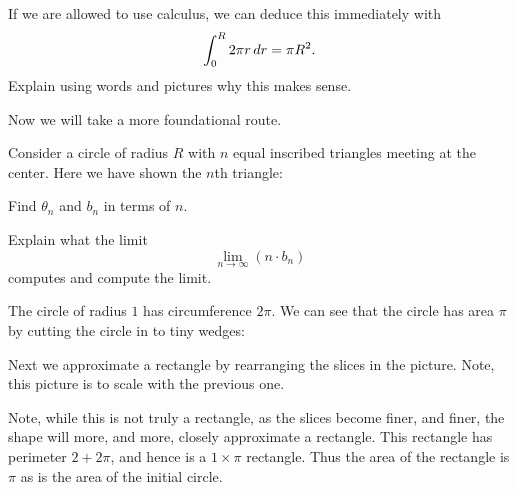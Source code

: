 \documentclass[hints,handout,noauthor,nooutcomes,12pt,newpage]{ximera}
\begin{document}
\begin{problem}
  If we are allowed to use calculus, we can deduce this immediately with
  \[
  \int_0^R 2\pi r \,d r = \pi R^2.
  \]
  Explain using words and pictures why this makes sense.
\end{problem}


Now we will take a more foundational route.


\begin{problem}
Consider a circle of radius $R$ with $n$ equal inscribed triangles
meeting at the center.  Here we have shown the $n$th triangle:
\begin{image}
\end{image}
Find $\theta_n$ and $b_n$ in terms of $n$.
\end{problem}


\begin{problem}
Explain what the limit
\[
\lim_{n\to\infty} \left(n\cdot b_n\right)
\]
computes and compute the limit.
\end{problem}



The circle of radius $1$ has circumference $2\pi$. We can see that the
circle has area $\pi$ by cutting the circle in to tiny wedges:
\begin{image}
\end{image}

Next we approximate a rectangle by rearranging the slices in the
picture. Note, this picture is to scale with the previous one.
\begin{image}
\end{image}
Note, while this is not truly a rectangle, as the slices become finer,
and finer, the shape will more, and more, closely approximate a
rectangle. This rectangle has perimeter $2+2\pi$, and hence is a
$1\times \pi$ rectangle. Thus the area of the rectangle is $\pi$ as is
the area of the initial circle.
\end{document}
